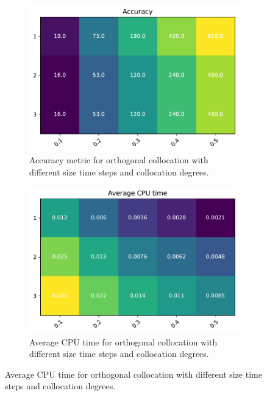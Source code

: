 \documentclass[]{article}
\begin{document}
\begin{figure}[H]
	\centering
	\begin{subfigure}[b]{0.45\textwidth}
		\centering
		\includegraphics[width=\textwidth]{figures/Accuracy.pdf}
		\caption{Accuracy metric for orthogonal collocation with different size time steps and collocation degrees.}
		\label{fig:oc_acc}
	\end{subfigure}%
	\hfill
	\begin{subfigure}[b]{0.45\textwidth}
		\centering
		\includegraphics[width=\textwidth]{figures/CPU.pdf}
		\caption{Average CPU time for orthogonal collocation with different size time steps and collocation degrees.}
		\label{fig:oc_cpu}
	\end{subfigure}
	\label{fig:oc}
\end{figure}
\end{document}
